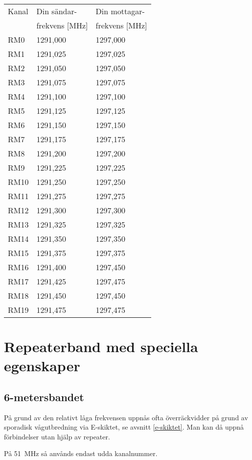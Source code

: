 \begin{tabular}{ l | l | l }
	Kanal & Din sändar- & Din mottagar- \\
	& frekvens [\si{\mega\hertz}] & frekvens [\si{\mega\hertz}] \\
	\hline
	RM0 & 1291,000 & 1297,000 \\
	RM1 & 1291,025 & 1297,025 \\
	RM2 & 1291,050 & 1297,050 \\
	RM3 & 1291,075 & 1297,075 \\
	RM4 & 1291,100 & 1297,100 \\
	RM5 & 1291,125 & 1297,125 \\
	RM6 & 1291,150 & 1297,150 \\
	RM7 & 1291,175 & 1297,175 \\
	RM8 & 1291,200 & 1297,200 \\
	RM9 & 1291,225 & 1297,225 \\
	RM10 & 1291,250 & 1297,250 \\
	RM11 & 1291,275 & 1297,275 \\
	RM12 & 1291,300 & 1297,300 \\
	RM13 & 1291,325 & 1297,325 \\
	RM14 & 1291,350 & 1297,350 \\
	RM15 & 1291,375 & 1297,375 \\
	RM16 & 1291,400 & 1297,450 \\
	RM17 & 1291,425 & 1297,475 \\
	RM18 & 1291,450 & 1297,450 \\
	RM19 & 1291,475 & 1297,475 \\
\end{tabular}

\newpage

\section[Speciella band]{Repeaterband med speciella egenskaper}
\subsection{6-metersbandet}

På grund av den relativt låga frekvensen uppnås ofta överräckvidder på grund av
sporadisk vågutbredning via E-skiktet, se avsnitt \ref{e-skiktet}.
Man kan då uppnå förbindelser utan hjälp av repeater.

På \SI{51}{\mega\hertz} så anvånds endast udda kanalnummer.

